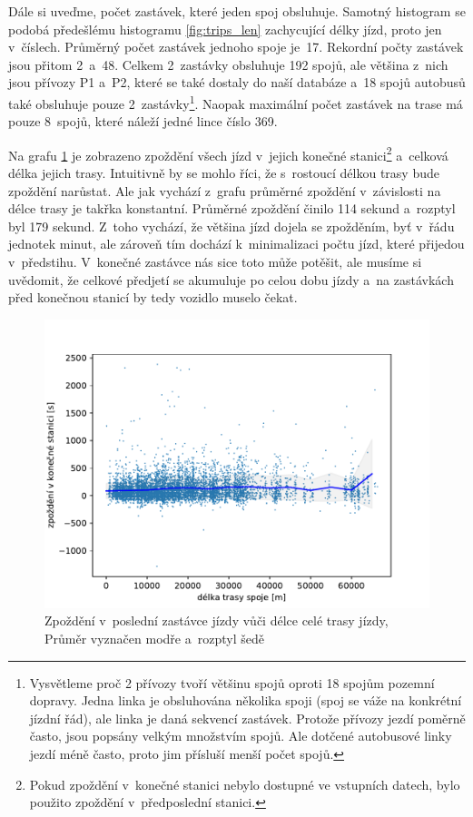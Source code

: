 \bigbreak

Dále si uveďme, počet zastávek, které jeden spoj obsluhuje. Samotný histogram se podobá předešlému histogramu \ref{fig:trips_len} zachycující délky jízd, proto jen v~číslech. Průměrný počet zastávek jednoho spoje je~17. Rekordní počty zastávek jsou přitom 2~a~48. Celkem 2~zastávky obsluhuje 192 spojů, ale většina z~nich jsou přívozy P1 a~P2, které se také dostaly do naší databáze a~18 spojů autobusů také obsluhuje pouze 2~zastávky\footnote{Vysvětleme proč 2 přívozy tvoří většinu spojů oproti 18 spojům pozemní dopravy. Jedna linka je obsluhována několika spoji (spoj se váže na konkrétní jízdní řád), ale linka je daná sekvencí zastávek. Protože přívozy jezdí poměrně často, jsou popsány velkým množstvím spojů. Ale dotčené autobusové linky jezdí méně často, proto jim přísluší menší počet spojů.}. Naopak maximální počet zastávek na trase má pouze 8~spojů, které náleží jedné lince číslo 369.


\bigbreak


Na grafu \ref{fig:trips_total_delay} je zobrazeno zpoždění všech jízd v~jejich konečné stanici\footnote{Pokud zpoždění v~konečné stanici nebylo dostupné ve vstupních datech, bylo použito zpoždění v~předposlední stanici.} a~celková délka jejich trasy. Intuitivně by se mohlo říci, že s~rostoucí délkou trasy bude zpoždění narůstat. Ale jak vychází z~grafu průměrné zpoždění v~závislosti na délce trasy je takřka konstantní. Průměrné zpoždění činilo 114 sekund a~rozptyl byl 179 sekund. Z~toho vychází, že většina jízd dojela se zpožděním, byť v~řádu jednotek minut, ale zároveň tím dochází k~minimalizaci počtu jízd, které přijedou v~předstihu. V~konečné zastávce nás sice toto může potěšit, ale musíme si uvědomit, že celkové předjetí se akumuluje po celou dobu jízdy a~na zastávkách před konečnou stanicí by tedy vozidlo muselo čekat.


\begin{figure}
   \centering
 \includegraphics[width=1\linewidth]{../img/trips_total_delay}
 \caption{Zpoždění v~poslední zastávce jízdy vůči délce celé trasy jízdy, Průměr vyznačen modře a~rozptyl šedě}
 \label{fig:trips_total_delay}
\end{figure}
